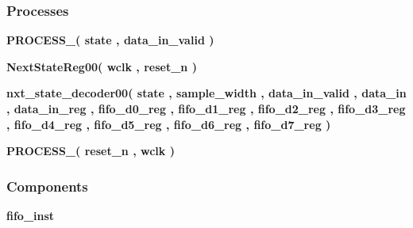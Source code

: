 \subsubsection*{Processes}
 \begin{DoxyCompactItemize}
\item 
{\bf P\+R\+O\+C\+E\+S\+S\+\_}{\bfseries  ( {\bfseries {\bfseries {\bf state}} \textcolor{vhdlchar}{ }} , {\bfseries {\bfseries {\bf data\+\_\+in\+\_\+valid}} \textcolor{vhdlchar}{ }} )}
\item 
{\bf Next\+State\+Reg00}{\bfseries  ( {\bfseries {\bfseries {\bf wclk}} \textcolor{vhdlchar}{ }} , {\bfseries {\bfseries {\bf reset\+\_\+n}} \textcolor{vhdlchar}{ }} )}
\item 
{\bf nxt\+\_\+state\+\_\+decoder00}{\bfseries  ( {\bfseries {\bfseries {\bf state}} \textcolor{vhdlchar}{ }} , {\bfseries {\bfseries {\bf sample\+\_\+width}} \textcolor{vhdlchar}{ }} , {\bfseries {\bfseries {\bf data\+\_\+in\+\_\+valid}} \textcolor{vhdlchar}{ }} , {\bfseries {\bfseries {\bf data\+\_\+in}} \textcolor{vhdlchar}{ }} , {\bfseries {\bfseries {\bf data\+\_\+in\+\_\+reg}} \textcolor{vhdlchar}{ }} , {\bfseries {\bfseries {\bf fifo\+\_\+d0\+\_\+reg}} \textcolor{vhdlchar}{ }} , {\bfseries {\bfseries {\bf fifo\+\_\+d1\+\_\+reg}} \textcolor{vhdlchar}{ }} , {\bfseries {\bfseries {\bf fifo\+\_\+d2\+\_\+reg}} \textcolor{vhdlchar}{ }} , {\bfseries {\bfseries {\bf fifo\+\_\+d3\+\_\+reg}} \textcolor{vhdlchar}{ }} , {\bfseries {\bfseries {\bf fifo\+\_\+d4\+\_\+reg}} \textcolor{vhdlchar}{ }} , {\bfseries {\bfseries {\bf fifo\+\_\+d5\+\_\+reg}} \textcolor{vhdlchar}{ }} , {\bfseries {\bfseries {\bf fifo\+\_\+d6\+\_\+reg}} \textcolor{vhdlchar}{ }} , {\bfseries {\bfseries {\bf fifo\+\_\+d7\+\_\+reg}} \textcolor{vhdlchar}{ }} )}
\item 
{\bf P\+R\+O\+C\+E\+S\+S\+\_}{\bfseries  ( {\bfseries {\bfseries {\bf reset\+\_\+n}} \textcolor{vhdlchar}{ }} , {\bfseries {\bfseries {\bf wclk}} \textcolor{vhdlchar}{ }} )}
\end{DoxyCompactItemize}
\subsubsection*{Components}
 \begin{DoxyCompactItemize}
\item 
{\bf fifo\+\_\+inst}  {\bfseries }  
\end{DoxyCompactItemize}
